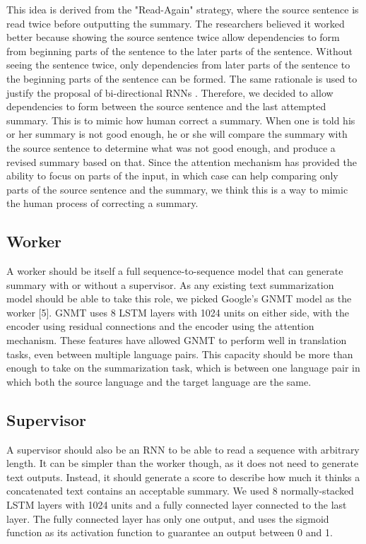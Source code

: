 \documentclass[letterpaper]{article} %
\begin{document}
This idea is derived from the "Read-Again" strategy, where the source sentence is read twice before outputting the summary. The researchers believed it worked better because showing the source sentence twice allow dependencies to form from beginning parts of the sentence to the later parts of the sentence. Without seeing the sentence twice, only dependencies from later parts of the sentence to the beginning parts of the sentence can be formed. The same rationale is used to justify the proposal of bi-directional RNNs \cite{schuster1997bidirectional}. Therefore, we decided to allow dependencies to form between the source sentence and the last attempted summary. This is to mimic how human correct a summary. When one is told his or her summary is not good enough, he or she will compare the summary with the source sentence to determine what was not good enough, and produce a revised summary based on that. Since the attention mechanism has provided the ability to focus on parts of the input, in which case can help comparing only parts of the source sentence and the summary, we think this is a way to mimic the human process of correcting a summary.

\subsection{Worker}
A worker should be itself a full sequence-to-sequence model that can generate summary with or without a supervisor. As any existing text summarization model should be able to take this role, we picked Google’s GNMT model as the worker [5]. GNMT uses 8 LSTM layers with 1024 units on either side, with the encoder using residual connections and the encoder using the attention mechanism. These features have allowed GNMT to perform well in translation tasks, even between multiple language pairs. This capacity should be more than enough to take on the summarization task, which is between one language pair in which both the source language and the target language are the same.

\subsection{Supervisor}
A supervisor should also be an RNN to be able to read a sequence with arbitrary length. It can be simpler than the worker though, as it does not need to generate text outputs. Instead, it should generate a score to describe how much it thinks a concatenated text contains an acceptable summary. We used 8 normally-stacked LSTM layers with 1024 units and a fully connected layer connected to the last layer. The fully connected layer has only one output, and uses the sigmoid function as its activation function to guarantee an output between 0 and 1.
\end{document}
